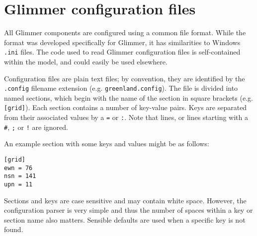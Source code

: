 \section{Glimmer configuration files}
\label{ug.sec.cfile}
%
All Glimmer components are configured using a common file
format. While the format was developed specifically for Glimmer, it
has similarities to Windows \texttt{.ini} files. The code used to read
Glimmer configuration files is self-contained within the model, and
could easily be used elsewhere.

Configuration files are plain text files; by convention, they are
identified by the \texttt{.config} filename extension
(e.g. \texttt{greenland.config}). The file is divided into named
sections, which begin with the name of the section in square brackets
(e.g. \texttt{[grid]}). Each section contains a number of key-value
pairs. Keys are separated from their associated values by a \texttt{=}
or \texttt{:}. Note that lines, or lines starting with a \texttt{\#},
\texttt{;} or \texttt{!} are ignored.

An example section with some keys and values might be as follows:
%
\begin{verbatim}
[grid]
ewn = 76 
nsn = 141
upn = 11
\end{verbatim}

Sections and keys are case sensitive and may contain white
space. However, the configuration parser is very simple and thus the
number of spaces within a key or section name also matters. Sensible
defaults are used when a specific key is not found. 
